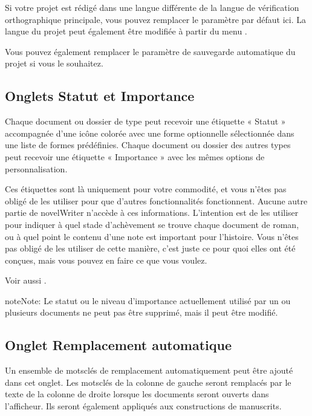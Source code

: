 \documentclass[a4paper,11pt,french]{sphinxmanual}
\begin{document}
\sphinxAtStartPar
Si votre projet est rédigé dans une langue différente de la langue de vérification orthographique principale, vous pouvez remplacer le paramètre par défaut ici. La langue du projet peut également être modifiée à partir du menu .

\sphinxAtStartPar
Vous pouvez également remplacer le paramètre de sauvegarde automatique du projet si vous le souhaitez.


\subsection{Onglets Statut et Importance}
\label{\detokenize{project_overview:status-and-importance-tabs}}
\sphinxAtStartPar
Chaque document ou dossier de type  peut recevoir une étiquette « Statut » accompagnée d’une icône colorée avec une forme optionnelle sélectionnée dans une liste de formes prédéfinies. Chaque document ou dossier des autres types peut recevoir une étiquette « Importance » avec les mêmes options de personnalisation.

\sphinxAtStartPar
Ces étiquettes sont là uniquement pour votre commodité, et vous n’êtes pas obligé de les utiliser pour que d’autres fonctionnalités fonctionnent. Aucune autre partie de novelWriter n’accède à ces informations. L’intention est de les utiliser pour indiquer à quel stade d’achèvement se trouve chaque document de roman, ou à quel point le contenu d’une note est important pour l’histoire. Vous n’êtes pas obligé de les utiliser de cette manière, c’est juste ce pour quoi elles ont été conçues, mais vous pouvez en faire ce que vous voulez.

\sphinxAtStartPar
Voir aussi {\hyperref[\detokenize{usage_project:a-ui-tree-status}]{}}.

\begin{sphinxadmonition}{note}{Note:}
\sphinxAtStartPar
Le statut ou le niveau d’importance actuellement utilisé par un ou plusieurs documents ne peut pas être supprimé, mais il peut être modifié.
\end{sphinxadmonition}


\subsection{Onglet Remplacement automatique}
\label{\detokenize{project_overview:auto-replace-tab}}
\sphinxAtStartPar
Un ensemble de mots\sphinxhyphen{}clés de remplacement automatiquement peut être ajouté dans cet onglet. Les mots\sphinxhyphen{}clés de la colonne de gauche seront remplacés par le texte de la colonne de droite lorsque les documents seront ouverts dans l’afficheur. Ils seront également appliqués aux constructions de manuscrits.
\end{document}
